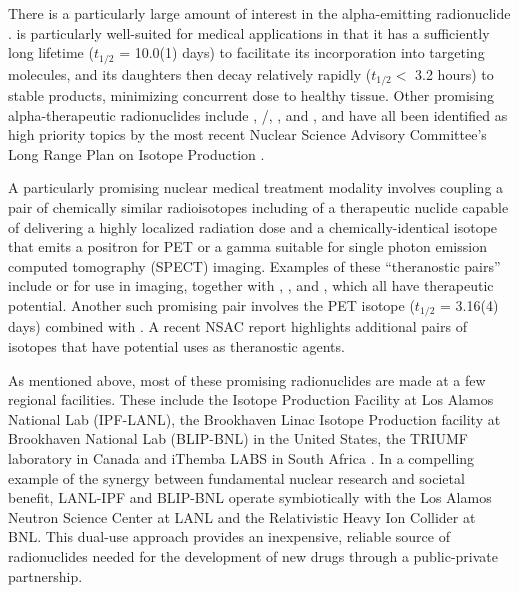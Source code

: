 \documentclass[letterpaper]{ar-1col}
\begin{document}
There is a particularly large amount of interest in the alpha-emitting radionuclide .
  is particularly well-suited for medical applications in that it has a sufficiently long lifetime ($t_{1/2}$ = 10.0(1) days) to facilitate its incorporation into targeting molecules, and its daughters then decay relatively rapidly ($t_{1/2}<$ 3.2 hours) to stable products, minimizing concurrent dose to healthy tissue.
Other promising alpha-therapeutic radionuclides include , /, ,  and , and have all been identified as high priority topics by the most recent Nuclear Science Advisory Committee's Long Range Plan on Isotope Production \cite{NSACIsotopesSubcommittee2015}.

A particularly promising  nuclear medical treatment modality involves coupling a pair of chemically similar radioisotopes including of a therapeutic nuclide capable of delivering a highly localized radiation dose and a chemically-identical isotope that emits a positron for PET or a gamma suitable for single photon emission computed tomography (SPECT) imaging.
Examples of these \enquote{theranostic pairs} include  or  for use in imaging, together with , , and , which all have  therapeutic potential.
Another such promising  pair involves the PET isotope  ($t_{1/2}$ = 3.16(4) days) combined with .
 A recent NSAC report \cite{NSACIsotopesSubcommittee2015} highlights additional pairs of isotopes that have potential uses as theranostic agents.


As mentioned above, most of these promising radionuclides are made at a few regional facilities.
 These include the Isotope Production Facility at Los Alamos National Lab (IPF-LANL), the Brookhaven Linac Isotope Production facility at Brookhaven National Lab (BLIP-BNL) in the United States, the TRIUMF laboratory in Canada and iThemba LABS in South Africa \cite{Iae675,NSACIsotopesSubcommittee2015}.
 In a compelling example of the synergy between fundamental nuclear research and societal benefit, LANL-IPF and BLIP-BNL operate symbiotically with the Los Alamos Neutron Science Center at LANL and the Relativistic Heavy Ion Collider at BNL.
 This dual-use approach provides an inexpensive, reliable source of radionuclides needed for the development of new drugs through a public-private partnership.
\end{document}
